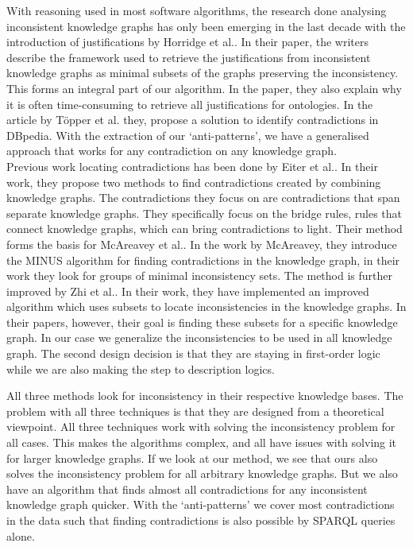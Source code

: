 \documentclass[11pt,letterpaper ,oneside ]{book}
\begin{document}
	With reasoning used in most software algorithms, the research done analysing inconsistent knowledge graphs has only been emerging in the last decade with the introduction of justifications by Horridge et al.\cite{Horridge:2009}. In their paper, the writers describe the framework used to retrieve the justifications from inconsistent knowledge graphs as minimal subsets of the graphs preserving the inconsistency. This forms an integral part of our algorithm. In the paper, they also explain why it is often time-consuming to retrieve all justifications for ontologies. In the article by T\"{o}pper et al.\cite{Topper:2012} they, propose a solution to identify contradictions in DBpedia. With the extraction of our `anti-patterns', we have a generalised approach that works for any contradiction on any knowledge graph. \\
	
	Previous work locating contradictions has been done by Eiter et al.\cite{Eiter:2010}. In their work, they propose two methods to find contradictions created by combining knowledge graphs. The contradictions they focus on are contradictions that span separate knowledge graphs. They specifically focus on the bridge rules, rules that connect knowledge graphs, which can bring contradictions to light. Their method forms the basis for McAreavey et al.\cite{McAreavey:2014}. In the work by McAreavey, they introduce the MINUS algorithm for finding contradictions in the knowledge graph, in their work they look for groups of minimal inconsistency sets. The method is further improved by Zhi et al.\cite{Zhi:2015}. In their work, they have implemented an improved algorithm which uses subsets to locate inconsistencies in the knowledge graphs. In their papers, however, their goal is finding these subsets for a specific knowledge graph. In our case we generalize the inconsistencies to be used in all knowledge graph. The second design decision is that they are staying in first-order logic while we are also making the step to description logics.
	
	All three methods look for inconsistency in their respective knowledge bases. The problem with all three techniques is that they are designed from a theoretical viewpoint. All three techniques work with solving the inconsistency problem for all cases. This makes the algorithms complex, and all have issues with solving it for larger knowledge graphs. If we look at our method, we see that ours also solves the inconsistency problem for all arbitrary knowledge graphs. But we also have an algorithm that finds almost all contradictions for any inconsistent knowledge graph quicker. With the `anti-patterns' we cover most contradictions in the data such that finding contradictions is also possible by SPARQL queries alone.
	
\end{document}
